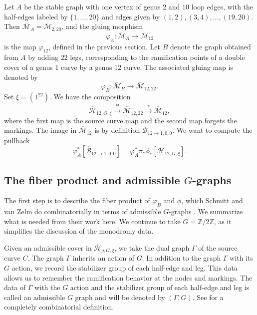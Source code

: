 \documentclass[12pt]{amsart}
\theoremstyle{definition}
\newcommand{\zz}{\mathbb{Z}}
\newcommand{\Bb}{\overline{\mathcal{B}}}
\newcommand{\Hb}{\overline{\mathcal{H}}}
\newcommand{\M}{\mathcal{M}}
\newcommand{\Mb}{\overline{\M}}
\begin{document}
Let $A$ be the stable graph with one vertex of genus $2$ and $10$ loop edges, with the half-edges labeled by $\{1,\dots,20\}$ and edges given by $(1,2),(3,4),\dots,(19,20)$.  Then $\Mb_{A}=\Mb_{2,20}$, and the gluing morphism
\[
\varphi_{A}:\Mb_{A}\rightarrow \Mb_{12}
\]
is the map $\varphi_{12}$, defined in the previous section.
 Let $B$ denote the graph obtained from $A$ by adding $22$ legs, corresponding to the ramification points of a double cover of a genus $1$ curve by a genus $12$ curve. 
The associated gluing map is denoted by 
 \[
 \varphi_{B}:\Mb_B\rightarrow \Mb_{12,22}.
 \]
 Set $\xi=(1^{22})$. We have the composition
 \[
 \Hb_{12,G,\xi}\xrightarrow{\phi} \Mb_{12,22}\xrightarrow{\pi} \Mb_{12},
 \]
 where the first map is the source curve map and the second map forgets the markings. The image in $\Mb_{12}$ is by definition $\Bb_{12\rightarrow 1,0,0}$. We want to compute the pullback
 \[
 \varphi_{A}^*[\Bb_{12\rightarrow 1, 0 ,0}]=\varphi_A^*\pi_*\phi_*[\Hb_{12,G,\xi}].
 \] 
 \subsection{The fiber product and admissible $G$-graphs}
 The first step is to describe the fiber product of $\varphi_{B}$ and $\phi$, which Schmitt and van Zelm do combinatorially in terms of admissible $G$-graphs \cite[Proposition 4.3]{SvZ}. We summarize what is needed from their work here. We continue to take $G=\zz/2\zz$, as it simplifies the discussion of the monodromy data.

Given an admissible cover in $\Hb_{g,G,\xi}$, we take the dual graph $\Gamma$ of the source curve $C$. The graph $\Gamma$ inherits an action of $G$. In addition to the graph $\Gamma$ with its $G$ action, we record the stabilizer group of each half-edge and leg. This data allows us to remember the ramification behavior at the nodes and markings. The data of $\Gamma$ with the $G$ action and the stabilizer group of each half-edge and leg is called an admissible $G$ graph and will be denoted by $(\Gamma,G)$. See \cite[Section 3.5]{SvZ} for a completely combinatorial definition.
 
\end{document}
